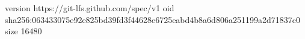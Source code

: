 version https://git-lfs.github.com/spec/v1
oid sha256:063433075e92e825bd39fd3f44628e6725eabd4b8a6d806a251199a2d71837c0
size 16480
